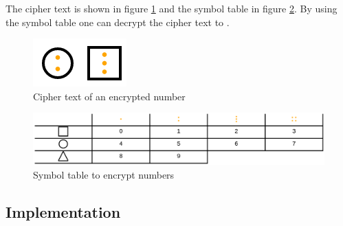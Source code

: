 \begin{example}
    The cipher text is shown in figure \ref{fig:cipher_number} and the symbol table in figure \ref{fig:symboltable_numbers}. By using the symbol table one can decrypt the cipher text to .
\end{example}

\begin{figure} 
    \centering
    \includegraphics[width=0.2 \columnwidth]{figures/cipher_number.png}
    \caption{Cipher text of an encrypted number} 
    \label{fig:cipher_number} 
\end{figure}

\begin{figure} 
    \centering
    \includegraphics[width=1.0 \columnwidth]{figures/symboltable_numbers.png}
    \caption{Symbol table to encrypt numbers} 
    \label{fig:symboltable_numbers} 
\end{figure}

\subsection{Implementation}

